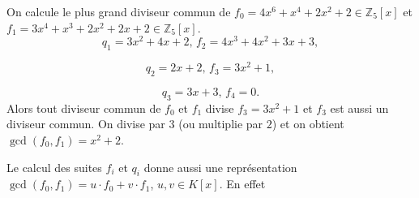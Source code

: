 
\begin{example}
  \label{exe:25-b}
  On calcule le plus grand diviseur commun de
$f_0 =  4 x^{6} + x^{4} + 2 x^{2} + 2 ∈ℤ_5[x]$  et 
$f_1 =  3 x^{4} + x^{3} + 2 x^{2} + 2 x + 2 ∈ℤ_5[x]$. 
  \begin{displaymath}
   q_1 =  3 x^{2} + 4 x + 2, \, 
   f_2 =  4 x^{3} + 4 x^{2} + 3 x + 3, 
 \end{displaymath}

 \begin{displaymath}
   q_2 =  2 x + 2, \, 
f_3 =  3 x^{2} + 1, 
\end{displaymath}

\begin{displaymath}
  q_3 =  3 x + 3, \, 
  f_4 =  0. 
\end{displaymath}
Alors tout diviseur commun de $f_0$ et $f_1$ divise $f_3 =  3 x^{2} + 1$ et $f_3$ est aussi un diviseur commun. On divise par $3$ (ou multiplie par $2$) et on obtient  $\gcd(f_0,f_1) = x^2 +2$. 

\end{example}

Le calcul des suites $f_i$ et $q_i$ donne aussi une représentation $\gcd(f_0,f_1) = u ⋅f_0 + v ⋅f_1$, $u,v ∈K[x]$. En effet


